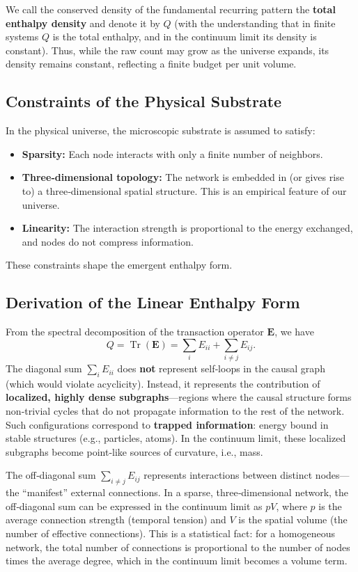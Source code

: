 \documentclass{article}
\begin{document}
We call the conserved density of the fundamental recurring pattern the \textbf{total enthalpy density} and denote it by $Q$ (with the understanding that in finite systems $Q$ is the total enthalpy, and in the continuum limit its density is constant). Thus, while the raw count may grow as the universe expands, its density remains constant, reflecting a finite budget per unit volume.

\subsection{Constraints of the Physical Substrate}
In the physical universe, the microscopic substrate is assumed to satisfy:
\begin{itemize}
    \item \textbf{Sparsity:} Each node interacts with only a finite number of neighbors.
    \item \textbf{Three‑dimensional topology:} The network is embedded in (or gives rise to) a three‑dimensional spatial structure. This is an empirical feature of our universe.
    \item \textbf{Linearity:} The interaction strength is proportional to the energy exchanged, and nodes do not compress information.
\end{itemize}
These constraints shape the emergent enthalpy form.

\subsection{Derivation of the Linear Enthalpy Form}
From the spectral decomposition of the transaction operator $\mathbf{E}$, we have
\[
Q = \operatorname{Tr}(\mathbf{E}) = \sum_i E_{ii} + \sum_{i\neq j} E_{ij}.
\]
The diagonal sum $\sum_i E_{ii}$ does \textbf{not} represent self‑loops in the causal graph (which would violate acyclicity). Instead, it represents the contribution of \textbf{localized, highly dense subgraphs}—regions where the causal structure forms non‑trivial cycles that do not propagate information to the rest of the network. Such configurations correspond to \textbf{trapped information}: energy bound in stable structures (e.g., particles, atoms). In the continuum limit, these localized subgraphs become point‑like sources of curvature, i.e., mass.

The off‑diagonal sum $\sum_{i\neq j} E_{ij}$ represents interactions between distinct nodes—the “manifest” external connections. In a sparse, three‑dimensional network, the off‑diagonal sum can be expressed in the continuum limit as $pV$, where $p$ is the average connection strength (temporal tension) and $V$ is the spatial volume (the number of effective connections). This is a statistical fact: for a homogeneous network, the total number of connections is proportional to the number of nodes times the average degree, which in the continuum limit becomes a volume term.
\end{document}
